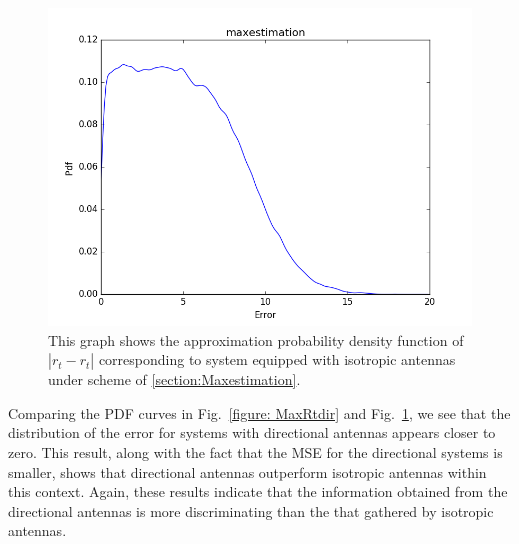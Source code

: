 \begin{figure}[]
	\centering
	\includegraphics[scale=0.5]{Figures/maxrtomni.png}
	\caption{This graph shows the approximation probability density function of $|r_{t}-\hat{r_{t}}|$ corresponding to system equipped with isotropic antennas under scheme of \ref{section:Maxestimation}. }
	\label{figure: MaxRtomni}
\end{figure}
Comparing the PDF curves in Fig.~\ref{figure: MaxRtdir} and Fig.~\ref{figure: MaxRtomni}, we see that the distribution of the error for systems with directional antennas appears closer to zero.
This result, along with the fact that the MSE for the directional systems is smaller, shows that directional antennas outperform isotropic antennas within this context.
Again, these results indicate that the information obtained from the directional antennas is more discriminating than the that gathered by isotropic antennas. 


